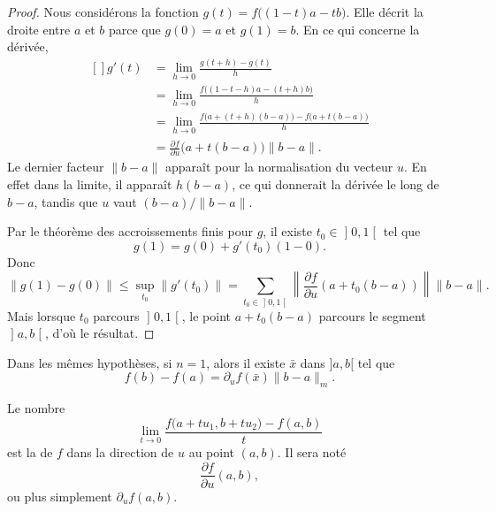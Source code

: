\begin{proof}
	Nous considérons la fonction $g(t)=f\big( (1-t)a-tb \big)$. Elle décrit la droite entre $a$ et $b$ parce que $g(0)=a$ et $g(1)=b$. En ce qui concerne la dérivée,
	\begin{equation}
		\begin{aligned}[]
			g'(t)&=\lim_{h\to 0} \frac{ g(t+h)-g(t) }{ h }\\
			&=\lim_{h\to 0} \frac{ f\big( (1-t-h)a-(t+h)b \big) }{ h }\\
			&=\lim_{h\to 0} \frac{ f\big( a+(t+h)(b-a) \big)-f\big( a+t(b-a) \big) }{ h }\\
			&=\frac{ \partial f }{ \partial u }\big( a+t(b-a) \big)\| b-a \|.
		\end{aligned}
	\end{equation}
	Le dernier facteur $\| b-a \|$ apparaît pour la normalisation du vecteur $u$. En effet dans la limite, il apparaît $h(b-a)$, ce qui donnerait la dérivée le long de $b-a$, tandis que $u$ vaut $(b-a)/\| b-a \|$.

	Par le théorème des accroissements finis pour $g$, il existe $t_0\in\mathopen] 0 , 1 \mathclose[$ tel que
	\begin{equation}
		g(1)=g(0)+g'(t_0)(1-0).
	\end{equation}
	Donc
	\begin{equation}
		\| g(1)-g(0) \|\leq\sup_{t_0}\| g'(t_0) \|=\sum_{t_0\in\mathopen] 0 , 1 \mathclose[}\left\| \frac{ \partial f }{ \partial u }(a+t_0(b-a)) \right\|\| b-a \|.
	\end{equation}
	Mais lorsque $t_0$ parcours $\mathopen] 0 , 1 \mathclose[$, le point $a+t_0(b-a)$ parcours le segment $\mathopen] a , b \mathclose[$, d'où le résultat.
\end{proof}

\begin{corollary}
	Dans les mêmes hypothèses, si $n=1$, alors il existe $\bar x $ dans $]a,b[$ tel que
	\[
		f(b)-f(a)=\partial_uf(\bar x)\|b-a\|_m.
	\]    
\end{corollary}

\begin{definition}
    Le nombre
    \begin{equation}
        \lim_{t\to 0} \frac{ f\big( a+tu_1,b+tu_2 \big)-f(a,b) }{ t }
    \end{equation}
    est la  de $f$ dans la direction de $u$ au point $(a,b)$. Il sera noté
    \begin{equation}
        \frac{ \partial f }{ \partial u }(a,b),
    \end{equation}
    ou plus simplement $\partial_uf(a,b)$.
\end{definition}

